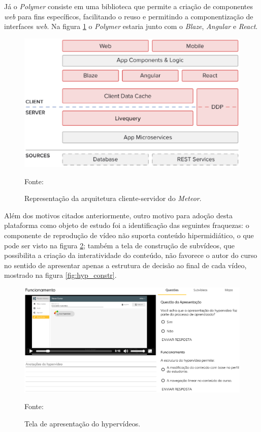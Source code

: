  Já o \textit{Polymer} consiste em uma biblioteca que permite a criação de componentes \textit{web} para fins específicos, facilitando o reuso e permitindo a componentização de interfaces \textit{web}. Na figura \ref{fig:meteor-arq} o \textit{Polymer} estaria junto com o \textit{Blaze}, \textit{Angular} e \textit{React}.

\begin{figure}[h!]
	\centering
  	\includegraphics[width=.9\linewidth]{figuras/meteor-arq.eps}
  	\caption{Representação da arquitetura cliente-servidor do \textit{Meteor}.}
	\small{Fonte: \cite{meteor2015}}
  	\label{fig:meteor-arq}
\end{figure} 

Além dos motivos citados anteriormente, outro motivo para adoção desta plataforma como objeto de estudo foi a identificação das seguintes fraquezas: o componente de reprodução de vídeo não suporta conteúdo hipermidiático, o que pode ser visto na figura \ref{fig:hyp_reprod}; também a tela de construção de subvídeos, que possibilita a criação da interatividade do conteúdo, não favorece o autor do curso no sentido de apresentar apenas a estrutura de decisão ao final de cada vídeo, mostrado na figura \ref{fig:hyp_constr}.

\begin{figure}[h!]
	\centering
  	\includegraphics[width=.9\linewidth]{figuras/reproducao_hyp.eps}
  	\caption{Tela de apresentação do hypervídeos.}
	\small{Fonte: \cite{arthurtcc}}
  	\label{fig:hyp_reprod}
\end{figure} 

